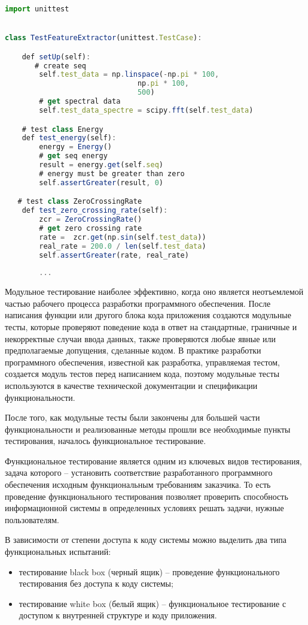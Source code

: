 \begin{lstlisting}[language=TypeScript, label=lst:testing:results]
import unittest


class TestFeatureExtractor(unittest.TestCase):

    def setUp(self):
       # create seq
        self.test_data = np.linspace(-np.pi * 100, 
        					   np.pi * 100, 
        					   500)
        # get spectral data
        self.test_data_spectre = scipy.fft(self.test_data)

    # test class Energy
    def test_energy(self):
        energy = Energy()
        # get seq energy 
        result = energy.get(self.seq)
        # energy must be greater than zero
        self.assertGreater(result, 0)

   # test class ZeroCrossingRate
    def test_zero_crossing_rate(self):
        zcr = ZeroCrossingRate()
        # get zero crossing rate
        rate =  zcr.get(np.sin(self.test_data))
        real_rate = 200.0 / len(self.test_data)
        self.assertGreater(rate, real_rate)
        
        ...
\end{lstlisting}


Модульное тестирование наиболее эффективно, когда оно является неотъемлемой частью рабочего процесса разработки программного обеспечения. После написания функции или другого блока кода приложения создаются модульные тесты, которые проверяют поведение кода в ответ на стандартные, граничные и некорректные случаи ввода данных, также проверяются любые явные или предполагаемые допущения, сделанные кодом. В практике разработки программного обеспечения, известной как разработка, управляемая тестом, создается модуль тестов перед написанием кода, поэтому модульные тесты используются в качестве технической документации и спецификации функциональности.

После того, как модульные тесты были закончены для большей части функциональности и реализованные методы прошли все необходимые пункты тестирования, началось функциональное тестирование.

Функциональное тестирование является одним из ключевых видов тестирования, задача которого – установить соответствие разработанного программного обеспечения исходным функциональным требованиям заказчика. То есть проведение функционального тестирования позволяет проверить способность информационной системы в определенных условиях решать задачи, нужные пользователям.

В зависимости от степени доступа к коду системы можно выделить два типа функциональных испытаний:
\begin{itemize}
\item тестирование black box (черный ящик) – проведение функционального тестирования без доступа к коду системы;
\item тестирование white box (белый ящик) – функциональное тестирование с доступом к внутренней структуре и коду приложения.
\end{itemize}

